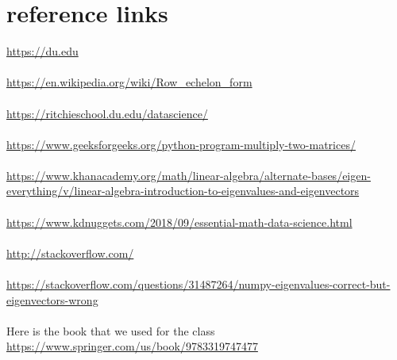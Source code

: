 \newpage
\section{reference links}
\url{https://du.edu}
\\
\\
\url{https://en.wikipedia.org/wiki/Row_echelon_form}
\\
\\
\url{https://ritchieschool.du.edu/datascience/}
\\
\\
\url{https://www.geeksforgeeks.org/python-program-multiply-two-matrices/}
\\
\\
\url{https://www.khanacademy.org/math/linear-algebra/alternate-bases/eigen-everything/v/linear-algebra-introduction-to-eigenvalues-and-eigenvectors}
\\
\\
\url{https://www.kdnuggets.com/2018/09/essential-math-data-science.html}
\\
\\
\url{http://stackoverflow.com/}
\\
\\
\url{https://stackoverflow.com/questions/31487264/numpy-eigenvalues-correct-but-eigenvectors-wrong}
\\
\\
Here is the book that we used for the class
\\
\url{https://www.springer.com/us/book/9783319747477}




